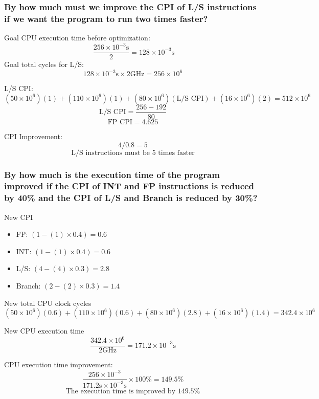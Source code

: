 \documentclass[fleqn]{article}
\begin{document}
\subsubsection{By how much must we improve the CPI of L/S instructions if we want the program to run two times faster?}
Goal CPU execution time before optimization:
\[ \ \frac{256 \times 10^{-3} \text{s}}{2} = 128 \times 10^{-3} \text{s}\]
Goal total cycles for L/S:
\[ 128 \times 10^{-3} \text{s} \times 2\text{GHz} =  256 \times 10^6\]

L/S CPI:
\[ (50 \times 10^6)(1) + (110 \times 10^6)(1) + (80 \times 10^6)(\text{L/S CPI}) + (16 \times 10^6)(2) =  512 \times 10^6 \]
\[ \text{L/S CPI} =  \frac{256 - 192}{80} \]
\[ \text{FP CPI} = 4.625 \]

CPI Improvement: 
\[ 4 / 0.8 = 5 \]
\[ \boxed{\text{L/S instructions must be 5 times faster}} \]


\subsubsection{By how much is the execution time of the program improved if the CPI of INT and FP instructions is reduced by 40\% and the CPI of L/S and Branch is reduced by 30\%?}
New CPI
\begin{itemize}[leftmargin=*]
    \item FP: $(1 - (1) \times 0.4) = 0.6$
    \item INT:  $(1 - (1) \times 0.4) = 0.6$
    \item L/S: $(4 - (4) \times 0.3)= 2.8$
    \item Branch: $(2 - (2) \times 0.3) = 1.4$
\end{itemize}

New total CPU clock cycles
\[ (50 \times 10^6)(0.6) + (110 \times 10^6)(0.6) + (80 \times 10^6)(2.8) + (16 \times 10^6)(1.4) =  342.4\times 10^6 \]

New CPU execution time
\[ \frac{342.4\times 10^6}{2\text{GHz}} = 171.2 \times 10^{-3}\text{s}\] 

CPU execution time improvement:
\[ \frac{256 \times 10^{-3}}  {171.2 \text{s} \times 10^{-3} \text{s}} \times 100\% = 149.5 \% \]
\[ \boxed{\text{The execution time is improved by } 149.5 \% } \]
\end{document}
